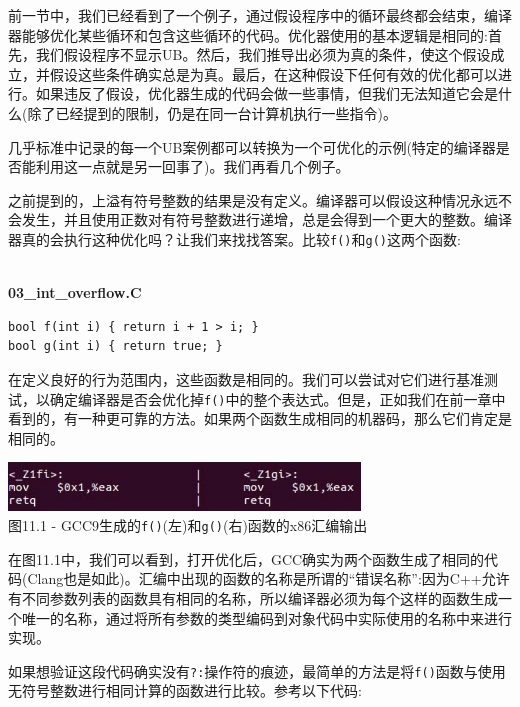 前一节中，我们已经看到了一个例子，通过假设程序中的循环最终都会结束，编译器能够优化某些循环和包含这些循环的代码。优化器使用的基本逻辑是相同的:首先，我们假设程序不显示UB。然后，我们推导出必须为真的条件，使这个假设成立，并假设这些条件确实总是为真。最后，在这种假设下任何有效的优化都可以进行。如果违反了假设，优化器生成的代码会做一些事情，但我们无法知道它会是什么(除了已经提到的限制，仍是在同一台计算机执行一些指令)。

几乎标准中记录的每一个UB案例都可以转换为一个可优化的示例(特定的编译器是否能利用这一点就是另一回事了)。我们再看几个例子。

之前提到的，上溢有符号整数的结果是没有定义。编译器可以假设这种情况永远不会发生，并且使用正数对有符号整数进行递增，总是会得到一个更大的整数。编译器真的会执行这种优化吗？让我们来找找答案。比较\texttt{f()}和\texttt{g()}这两个函数:

\hspace*{\fill} \\ %
\noindent
\textbf{03\_int\_overflow.C}
\begin{lstlisting}[style=styleCXX]
bool f(int i) { return i + 1 > i; }
bool g(int i) { return true; }
\end{lstlisting}

在定义良好的行为范围内，这些函数是相同的。我们可以尝试对它们进行基准测试，以确定编译器是否会优化掉\texttt{f()}中的整个表达式。但是，正如我们在前一章中看到的，有一种更可靠的方法。如果两个函数生成相同的机器码，那么它们肯定是相同的。 

\begin{center}
\includegraphics[width=0.7\textwidth]{content/3/chapter11/images/1.jpg}\\
图11.1 - GCC9生成的\texttt{f()}(左)和\texttt{g()}(右)函数的x86汇编输出
\end{center}

在图11.1中，我们可以看到，打开优化后，GCC确实为两个函数生成了相同的代码(Clang也是如此)。汇编中出现的函数的名称是所谓的“错误名称”:因为C++允许有不同参数列表的函数具有相同的名称，所以编译器必须为每个这样的函数生成一个唯一的名称，通过将所有参数的类型编码到对象代码中实际使用的名称中来进行实现。

如果想验证这段代码确实没有\texttt{?:}操作符的痕迹，最简单的方法是将\texttt{f()}函数与使用无符号整数进行相同计算的函数进行比较。参考以下代码:

